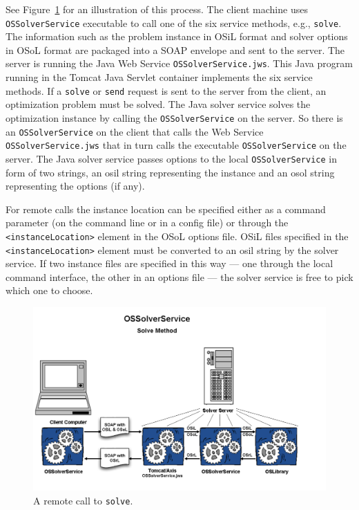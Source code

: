 \documentclass[11pt]{article}
\newcommand{\figurepath}{./figures}
\newcounter{Fig}
\renewcommand{\_}{{\char"5F}}
\renewcommand{\{}{{\char"7B}}
\renewcommand{\}}{{\char"7D}}
\renewcommand{\^}{{\char"0D}}
\renewcommand{\'}{{\char"0D}}
\begin{document}
\begin{enumerate}[Step 1:]
See Figure~\ref{figure:ossolverservice} for an illustration of this process.
The client machine uses {\tt OSSolverService} executable to call one of the
six service methods, e.g., {\tt solve}. 
The  information such as the problem
instance in OSiL format and solver options in OSoL format are packaged into
a SOAP envelope and sent to the server. The server is running the Java Web
Service {\tt OSSolverService.jws}. This Java program running in the Tomcat
Java Servlet container implements the six service methods. If a {\tt solve}
or {\tt send} request is sent to the server from the client, an optimization
problem must be solved. The Java solver service solves the optimization instance
by  calling the  {\tt OSSolverService} on the server. So there is an {\tt OSSolverService}
on the client that calls the Web Service {\tt  OSSolverService.jws} that in turn
calls  the executable {\tt OSSolverService} on the server.
The Java solver service passes options to the local {\tt OSSolverService}
in form of two strings, an osil string representing the instance and an osol string
representing the options (if any). 


For remote calls the instance location can be specified either as a command parameter 
(on the command line or in a config file)
or through the {\tt <instanceLocation>} element in the OSoL options file.
OSiL files specified in the {\tt <instanceLocation>} element must be converted to an osil string
by the solver service.
If two instance files
are specified in this way --- one through the local command interface, the other in an options file --- 
the solver service is free to pick which one to choose.





\begin{figure}
\centering
\includegraphics[scale=0.5]{./figures/Figure10.png}
\caption{A remote call to {\tt solve}.}
\label{figure:ossolverservice}
\end{figure}



\end{enumerate}
\end{document}
